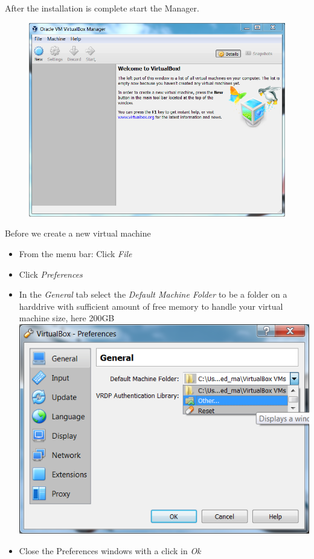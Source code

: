 \clearpage


After the installation is complete start the \marktool{\virtualboxname} Manager.

\begin{figure}[htbp]
\centering
\includegraphics[scale=\screenshotscalefac]{Figures/VirtualBox_Start_Menu}
\end{figure}

Before we create a new virtual machine

\begin{itemize}[noitemsep]
 \item From the menu bar: Click \textit{File}
 \item Click \textit{Preferences}
 \item In the \textit{General} tab select the \textit{Default Machine Folder} to be a folder on a harddrive with sufficient amount of free memory to handle your virtual machine size, here 200GB\\
 \includegraphics[scale=\screenshotscalefac]{Figures/VirtualBox_Preferences_General}
 \item Close the Preferences windows with a click in \textit{Ok}
\end{itemize}

